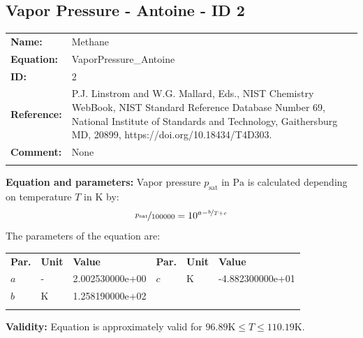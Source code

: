 \FloatBarrier
\newpage
\subsection{Vapor Pressure - Antoine - ID 2}
%
\begin{tabular}[l]{|lp{11.5cm}|}
\hline
\addlinespace

\textbf{Name:} & Methane \\
\textbf{Equation:} & VaporPressure\_Antoine \\
\textbf{ID:} & 2 \\
\textbf{Reference:} & P.J. Linstrom and W.G. Mallard, Eds., NIST Chemistry WebBook, NIST Standard Reference Database Number 69, National Institute of Standards and Technology, Gaithersburg MD, 20899, https://doi.org/10.18434/T4D303. \\
\textbf{Comment:} & None \\

\addlinespace
\hline
\end{tabular}
\newline

\textbf{Equation and parameters:}
\newline
%
Vapor pressure $p_\mathrm{sat}$ in $\si{\pascal}$ is calculated depending on temperature $T$ in $\si{\kelvin}$ by:
%
\begin{equation*}
\nicefrac{p_\mathrm{sat}}{100000} = 10^{a - \nicefrac{b}{T + c}}
\end{equation*}
%
The parameters of the equation are:
%
\begin{longtable}[l]{lll|lll}
\toprule
\addlinespace
\textbf{Par.} & \textbf{Unit} & \textbf{Value} &	\textbf{Par.} & \textbf{Unit} & \textbf{Value} \\
\addlinespace
\midrule
\endhead

\bottomrule
\endfoot
\bottomrule
\endlastfoot
\addlinespace

$a$ & - & 2.002530000e+00 & $c$ & $\si{\kelvin}$  & -4.882300000e+01 \\
$b$ & $\si{\kelvin}$ & 1.258190000e+02 & & & \\

\addlinespace\end{longtable}

\textbf{Validity:}
\newline
Equation is approximately valid for $96.89 \si{\kelvin} \leq T \leq 110.19 \si{\kelvin}$.
\newline

